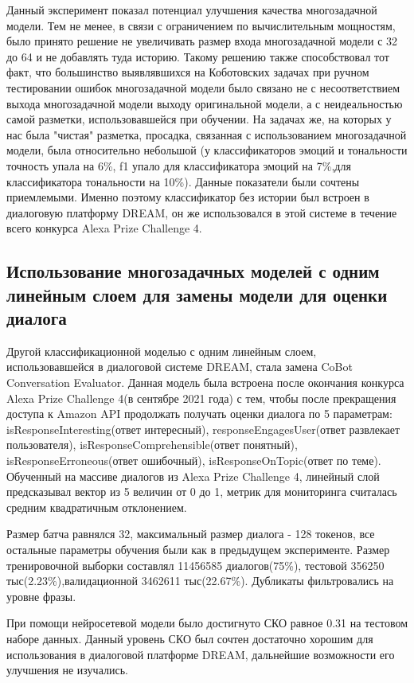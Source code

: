 Данный эксперимент показал потенциал улучшения качества многозадачной модели. Тем не менее, в связи с ограничением по вычислительным мощностям, было принято решение не увеличивать размер входа многозадачной модели с 32 до 64 и не добавлять туда историю. Такому решению также способствовал тот факт, что большинство выявлявшихся на Коботовских задачах при ручном тестировании ошибок многозадачной модели было связано не с несоответствием выхода многозадачной модели выходу оригинальной модели, а с неидеальностью самой разметки, использовавшейся при обучении. 
На задачах же, на которых у нас была "чистая" разметка, просадка, связанная с использованием многозадачной модели, была относительно небольшой (у классификаторов эмоций и тональности точность упала на 6\%, f1 упало для классификатора эмоций на 7\%,для классификатора тональности на 10\%). Данные показатели были сочтены приемлемыми. Именно поэтому классификатор без истории был встроен в диалоговую платформу DREAM, он же использовался в этой системе в течение всего конкурса Alexa Prize Challenge 4.

\subsection{Использование многозадачных моделей с одним линейным слоем для замены модели для оценки диалога}
Другой классификационной моделью с одним линейным слоем, использовавшейся в диалоговой системе DREAM, стала замена CoBot Conversation Evaluator. Данная модель была встроена после окончания конкурса Alexa Prize Challenge 4(в сентябре 2021 года) с тем, чтобы после прекращения доступа к Amazon API продолжать получать оценки диалога по 5 параметрам: isResponseInteresting(ответ интересный), responseEngagesUser(ответ развлекает пользователя), isResponseComprehensible(ответ понятный), isResponseErroneous(ответ ошибочный), isResponseOnTopic(ответ по теме). Обученный на массиве диалогов из Alexa Prize Challenge 4, линейный слой предсказывал вектор из 5 величин от 0 до 1, метрик для мониторинга считалась средним квадратичным отклонением. 

Размер батча равнялся 32, максимальный размер диалога - 128 токенов, все остальные параметры обучения были как в предыдущем эксперименте. Размер тренировочной выборки составлял 11456585 диалогов(75\%), тестовой 356250 тыс(2.23\%),валидационной 3462611 тыс(22.67\%). Дубликаты фильтровались на уровне фразы.

При помощи нейросетевой модели было достигнуто СКО равное 0.31 на тестовом наборе данных. Данный уровень СКО был сочтен достаточно хорошим для использования в диалоговой платформе DREAM, дальнейшие возможности его улучшения не изучались.


